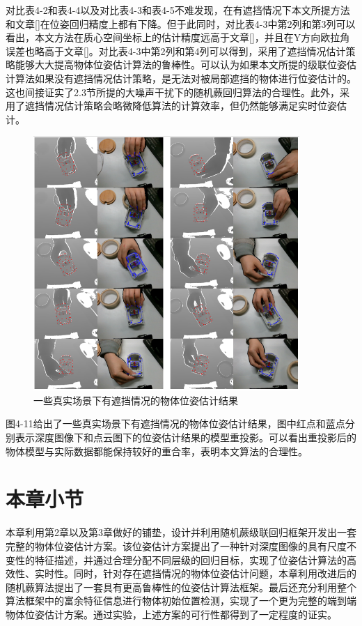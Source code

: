 对比表4-2和表4-4以及对比表4-3和表4-5不难发现，在有遮挡情况下本文所提方法和文章[]在位姿回归精度上都有下降。但于此同时，对比表4-3中第2列和第3列可以看出，本文方法在质心空间坐标上的估计精度远高于文章[]，并且在Y方向欧拉角误差也略高于文章[]。对比表4-3中第2列和第4列可以得到，采用了遮挡情况估计策略能够大大提高物体位姿估计算法的鲁棒性。可以认为如果本文所提的级联位姿估计算法如果没有遮挡情况估计策略，是无法对被局部遮挡的物体进行位姿估计的。这也间接证实了2.3节所提的大噪声干扰下的随机蕨回归算法的合理性。此外，采用了遮挡情况估计策略会略微降低算法的计算效率，但仍然能够满足实时位姿估计。

\begin{figure}[htb]
	\centering 
	\includegraphics[width=0.9\textwidth]{./mypic/71.png} 
	\caption{一些真实场景下有遮挡情况的物体位姿估计结果} 
\end{figure}

图4-11给出了一些真实场景下有遮挡情况的物体位姿估计结果，图中红点和蓝点分别表示深度图像下和点云图下的位姿估计结果的模型重投影。可以看出重投影后的物体模型与实际数据都能保持较好的重合率，表明本文算法的合理性。



\section{本章小节}

本章利用第2章以及第3章做好的铺垫，设计并利用随机蕨级联回归框架开发出一套完整的物体位姿估计方案。该位姿估计方案提出了一种针对深度图像的具有尺度不变性的特征描述，并通过合理分配不同层级的回归目标，实现了位姿估计算法的高效性、实时性。同时，针对存在遮挡情况的物体位姿估计问题，本章利用改进后的随机蕨算法提出了一套具有更高鲁棒性的位姿估计算法框架。最后还充分利用整个算法框架中的富余特征信息进行物体初始位置检测，实现了一个更为完整的端到端物体位姿估计方案。通过实验，上述方案的可行性都得到了一定程度的证实。














